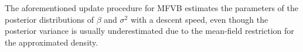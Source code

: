 
The aforementioned update procedure for MFVB estimates the parameters of the posterior distributions of $\beta$ and $\sigma^2$ with a descent speed, even though the posterior variance is usually underestimated due to the mean-field restriction for the approximated density.